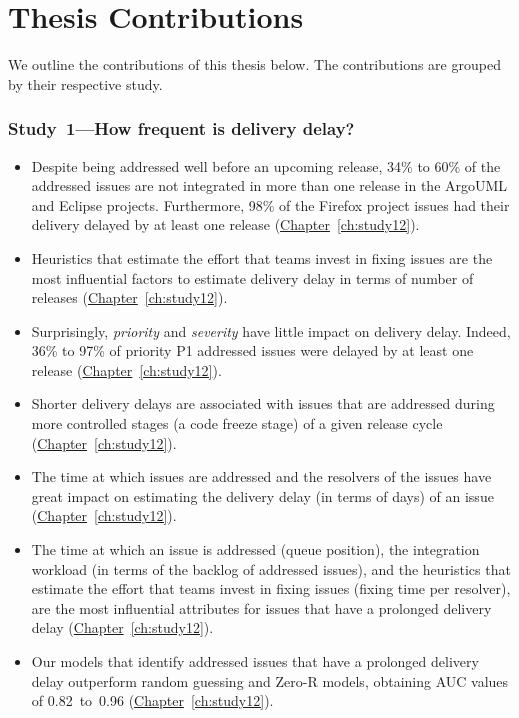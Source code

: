 \section{Thesis Contributions}

We outline the contributions of this thesis below. The contributions are grouped
by their respective study.

\subsubsection*{Study~1---How frequent is delivery delay?}

\begin{itemize}

	\item Despite being addressed well before an upcoming release, 34\% to
		60\% of the addressed issues are not integrated in more than one
		release in the ArgoUML and Eclipse projects. Furthermore, 98\%
		of the Firefox project issues had their delivery delayed by
		at least one release
		(\hyperref[ch:study12]{Chapter}~\ref{ch:study12}).

	\item Heuristics that estimate the effort that teams invest in
		fixing issues are the most influential factors to
		estimate delivery delay in terms of number of releases
		(\hyperref[ch:study12]{Chapter}~\ref{ch:study12}).

	\item Surprisingly, \textit{priority} and \textit{severity} have little
		impact on delivery delay. Indeed, 36\% to 97\% of priority P1
		addressed issues were delayed by at least one release
		(\hyperref[ch:study12]{Chapter}~\ref{ch:study12}).

	\item Shorter delivery delays are associated with issues that are
		addressed during more controlled stages (\eg a code freeze
		stage) of a given release cycle
		(\hyperref[ch:study12]{Chapter}~\ref{ch:study12}).

	\item The time at which issues are addressed and the resolvers
		of the issues have great impact on estimating the
		delivery delay (in terms of days) of an issue
		(\hyperref[ch:study12]{Chapter}~\ref{ch:study12}).

	\item The time at which an issue is addressed (queue position), the
		integration workload (in terms of the backlog of addressed
		issues), and the heuristics that estimate the effort that teams
		invest in fixing issues (fixing time per resolver), are the most
		influential attributes for issues that have a prolonged delivery
		delay (\hyperref[ch:study12]{Chapter}~\ref{ch:study12}). 

	\item Our models that identify addressed issues that have a prolonged
		delivery delay outperform random guessing and Zero-R models,
		obtaining AUC values of 0.82~to~0.96
		(\hyperref[ch:study12]{Chapter}~\ref{ch:study12}).

\end{itemize}

